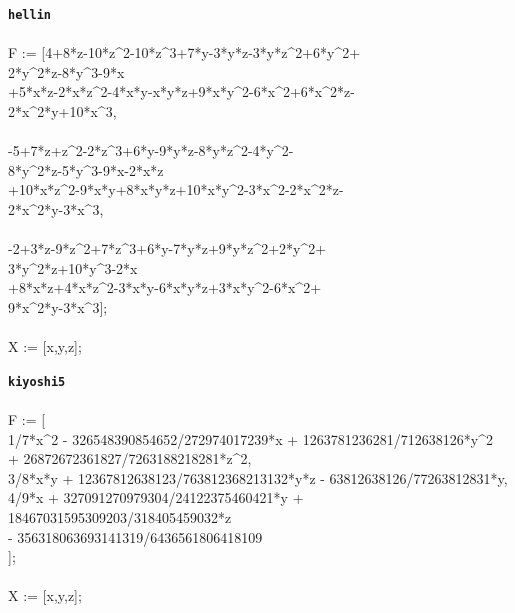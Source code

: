 \documentclass[letterpaper,12pt,titlepage,oneside,final]{book}
\newenvironment{codefont}{\footnotesize\ttfamily}{\par}
\begin{document}
\begin{appendices}
\noindent\textbf{\texttt{hellin}}\\\\
\noindent\begin{codefont}
  F := [4+8*z-10*z\^{}2-10*z\^{}3+7*y-3*y*z-3*y*z\^{}2+6*y\^{}2+\\2*y\^{}2*z-8*y\^{}3-9*x\\
     +5*x*z-2*x*z\^{}2-4*x*y-x*y*z+9*x*y\^{}2-6*x\^{}2+6*x\^{}2*z-\\2*x\^{}2*y+10*x\^{}3,\\
\\
     -5+7*z+z\^{}2-2*z\^{}3+6*y-9*y*z-8*y*z\^{}2-4*y\^{}2-\\8*y\^{}2*z-5*y\^{}3-9*x-2*x*z\\
     +10*x*z\^{}2-9*x*y+8*x*y*z+10*x*y\^{}2-3*x\^{}2-2*x\^{}2*z-\\2*x\^{}2*y-3*x\^{}3,\\
\\
     -2+3*z-9*z\^{}2+7*z\^{}3+6*y-7*y*z+9*y*z\^{}2+2*y\^{}2+\\3*y\^{}2*z+10*y\^{}3-2*x\\
     +8*x*z+4*x*z\^{}2-3*x*y-6*x*y*z+3*x*y\^{}2-6*x\^{}2+\\9*x\^{}2*y-3*x\^{}3];\\
\\
X := [x,y,z];\\
\end{codefont}

\noindent\textbf{\texttt{kiyoshi5}}\\\\
\noindent\begin{codefont}
  F := [ \\
  1/7*x\^{}2 - 326548390854652/272974017239*x + 1263781236281/712638126*y\^{}2\\
  + 26872672361827/7263188218281*z\^{}2,\\
  3/8*x*y + 12367812638123/763812368213132*y*z - 63812638126/77263812831*y,\\
  4/9*x + 327091270979304/24122375460421*y + 18467031595309203/318405459032*z\\
  - 356318063693141319/6436561806418109\\
  ];\\
  \\
  X := [x,y,z];\\
\end{codefont}


\end{appendices}
\end{document}
